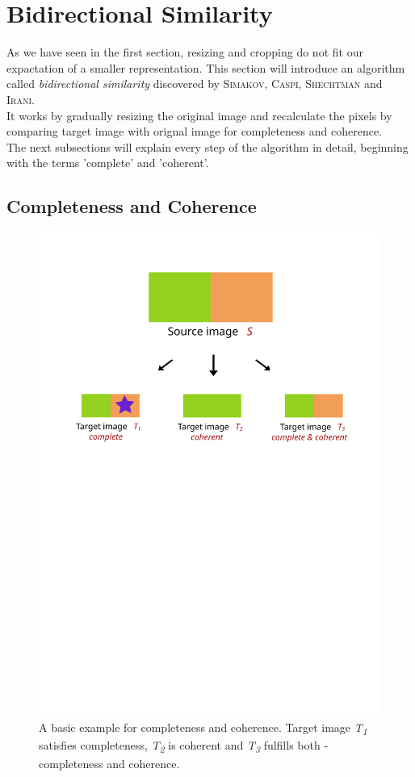 \section{Bidirectional Similarity}
As we have seen in the first section, resizing and cropping do not fit our expactation of a smaller representation. This section will introduce an algorithm called \textit{bidirectional similarity} discovered by \textsc{Simakov, Caspi, Shechtman} and \textsc{Irani}.\\
It works by gradually resizing the original image and recalculate the pixels by comparing target image with orignal image for completeness and coherence.\\
The next subsections will explain every step of the algorithm in detail, beginning with the terms 'complete' and 'coherent'.

\subsection{Completeness and Coherence}
\begin{figure}[h]
\centering
\includegraphics[scale=0.6]{img/cac}
\caption[Completeness and Coherence]{A basic example for completeness and coherence. Target image \textit{T\textsubscript{1}} satisfies completeness, \textit{T\textsubscript{2}} is coherent and \textit{T\textsubscript{3}} fulfills both - completeness and coherence.}
\label{fig:Completeness and Coherence}
\end{figure}

